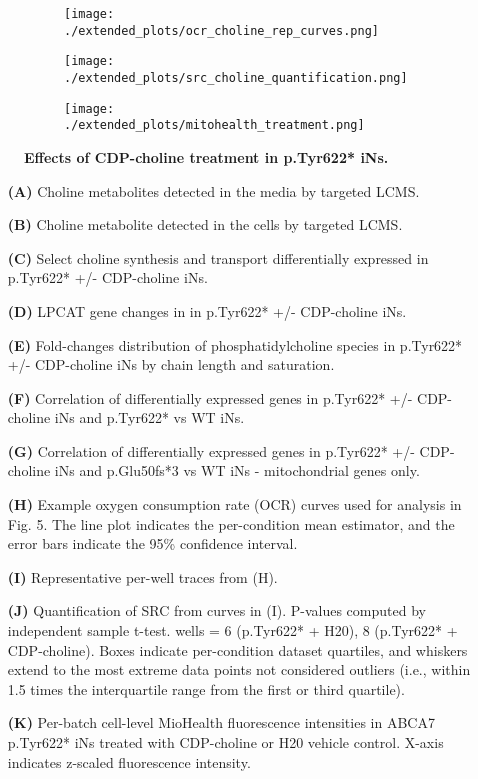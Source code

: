 \begin{figure}[H]
\begin{subfigure}[t]{.25\textwidth}
        \caption{}
        \texttt{[image: ./extended\_plots/ocr\_choline\_rep\_curves.png]}        
    \end{subfigure}
    \begin{subfigure}[t]{.22\textwidth}
        \caption{}
        \texttt{[image: ./extended\_plots/src\_choline\_quantification.png]}        
    \end{subfigure}
    \hspace{.25cm}
    \begin{subfigure}[t]{.45\textwidth}
        \caption{}
        \texttt{[image: ./extended\_plots/mitohealth\_treatment.png]}        
    \end{subfigure}
    \caption{
         \textbf{Effects of CDP-choline treatment in p.Tyr622* iNs.}\\
     }
     \label{fig:choline_treatment}
\end{figure}
\begin{itemize}
    \item[\textbf{(A)}] Choline metabolites detected in the media by targeted LCMS.
    \item[\textbf{(B)}] Choline metabolite detected in the cells by targeted LCMS.
    \item[\textbf{(C)}] Select choline synthesis and transport differentially expressed in p.Tyr622* +/- CDP-choline iNs.
    \item[\textbf{(D)}] LPCAT gene changes in in p.Tyr622* +/- CDP-choline iNs.
    \item[\textbf{(E)}] Fold-changes distribution of phosphatidylcholine species in p.Tyr622* +/- CDP-choline iNs by chain length and saturation.
    \item[\textbf{(F)}] Correlation of differentially expressed genes in p.Tyr622* +/- CDP-choline iNs and p.Tyr622* vs WT iNs.
    \item[\textbf{(G)}] Correlation of differentially expressed genes in p.Tyr622* +/- CDP-choline iNs and p.Glu50fs*3 vs WT iNs - mitochondrial genes only.
    \item[\textbf{(H)}] Example oxygen consumption rate (OCR) curves used for analysis in Fig. 5. The line plot indicates the per-condition mean estimator, and the error bars indicate the 95\% confidence interval. 
    \item[\textbf{(I)}] Representative per-well traces from (H).
    \item[\textbf{(J)}] Quantification of SRC from curves in (I). P-values computed by independent sample t-test.  wells = 6 (p.Tyr622* + H20), 8 (p.Tyr622* + CDP-choline). Boxes indicate per-condition dataset quartiles, and whiskers extend to the most extreme data points not considered outliers (i.e., within 1.5 times the interquartile range from the first or third quartile). 
    \item[\textbf{(K)}] Per-batch cell-level MioHealth fluorescence intensities in ABCA7 p.Tyr622* iNs treated with CDP-choline or H20 vehicle control. X-axis indicates z-scaled fluorescence intensity.
\end{itemize}